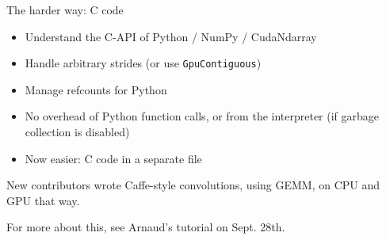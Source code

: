 \documentclass[a4paper,9pt]{beamer}
\begin{document}
\begin{frame}[fragile]{The harder way: C code}
  \begin{itemize}
    \item Understand the C-API of Python / NumPy / CudaNdarray
    \item Handle arbitrary strides (or use \verb|GpuContiguous|)
    \item Manage refcounts for Python
    \item No overhead of Python function calls, or from the interpreter (if garbage
      collection is disabled)
    \item Now easier: C code in a separate file
  \end{itemize}
  New contributors wrote Caffe-style convolutions, using GEMM, on CPU and GPU that way.

  For more about this, see Arnaud's tutorial on Sept. 28th.
\end{frame}
\end{document}
